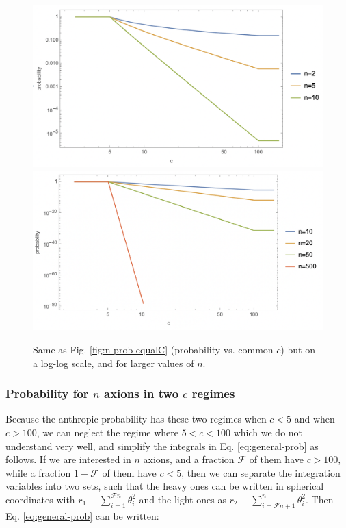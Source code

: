\documentclass[11pt]{article}
\begin{document}
\begin{figure}[h]
    \includegraphics[scale=0.45]{figs/naxions-equalC-loglog1.png}
    \includegraphics[scale=0.45]{figs/naxions-equalC-loglog2.png}
    \centering
    \caption{Same as Fig. \ref{fig:n-prob-equalC} (probability vs. common $c$) but on a log-log scale, and for larger values of $n$.}
    \label{fig:n-prob-equalC-loglog}
\end{figure}

\subsubsection{Probability for $n$ axions in two $c$ regimes}

Because the anthropic probability has these two regimes when $c<5$ and when $c>100$, we can neglect the regime where $5<c<100$ which we do not understand very well, and simplify the integrals in Eq. \eqref{eq:general-prob} as follows. If we are interested in $n$ axions, and a fraction $\mathcal{F}$ of them have $c>100$, while a fraction $1-\mathcal{F}$ of them have $c<5$, then we can separate the integration variables into two sets, such that the heavy ones can be written in spherical coordinates with $r_1 \equiv \sum_{i=1}^{\mathcal{F}n} \theta_i^2$ and the light ones as $r_2 \equiv \sum_{i=\mathcal{F}n+1}^{n} \theta_i^2$. Then Eq. \eqref{eq:general-prob} can be written:
\end{document}
